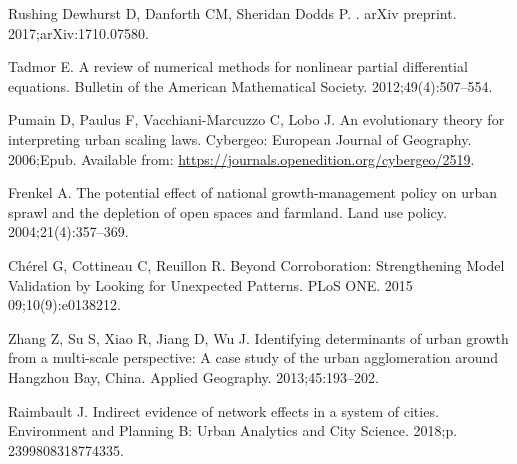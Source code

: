 \documentclass[10pt,letterpaper]{article}
\begin{document}
\begin{thebibliography}{10}
{Rushing Dewhurst} D, {Danforth} CM, {Sheridan Dodds} P.
.
\newblock arXiv preprint. 2017;arXiv:1710.07580.

Tadmor E.
\newblock A review of numerical methods for nonlinear partial differential
  equations.
\newblock Bulletin of the American Mathematical Society. 2012;49(4):507--554.

Pumain D, Paulus F, Vacchiani-Marcuzzo C, Lobo J.
\newblock An evolutionary theory for interpreting urban scaling laws.
\newblock Cybergeo: European Journal of Geography. 2006;Epub.
\newblock Available from: \url{https://journals.openedition.org/cybergeo/2519}.

Frenkel A.
\newblock The potential effect of national growth-management policy on urban
  sprawl and the depletion of open spaces and farmland.
\newblock Land use policy. 2004;21(4):357--369.

Ch{\'e}rel G, Cottineau C, Reuillon R.
\newblock Beyond Corroboration: Strengthening Model Validation by Looking for
  Unexpected Patterns.
\newblock PLoS ONE. 2015 09;10(9):e0138212.

Zhang Z, Su S, Xiao R, Jiang D, Wu J.
\newblock Identifying determinants of urban growth from a multi-scale
  perspective: A case study of the urban agglomeration around Hangzhou Bay,
  China.
\newblock Applied Geography. 2013;45:193--202.

Raimbault J.
\newblock Indirect evidence of network effects in a system of cities.
\newblock Environment and Planning B: Urban Analytics and City Science. 2018;p.
  2399808318774335.

\end{thebibliography}
\end{document}
